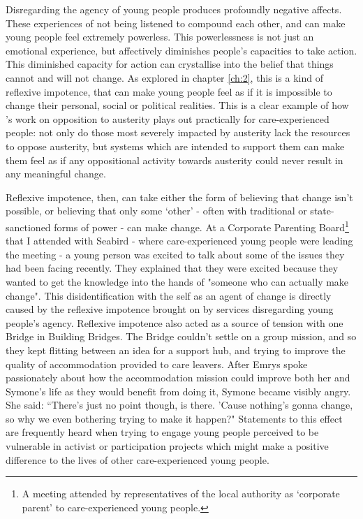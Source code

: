 Disregarding the agency of young people produces profoundly negative affects. These experiences of not being listened to compound each other, and can make young people feel extremely powerless. This powerlessness is not just an emotional experience, but affectively diminishes people’s capacities to take action. This diminished capacity for action can crystallise into the belief that things cannot and will not change. As explored in chapter \ref{ch:2}, this is a kind of reflexive impotence, that can make young people feel as if it is impossible to change their personal, social or political realities. This is a clear example of how \citet{harrison_cant_2020}’s work on opposition to austerity plays out practically for care-experienced people: not only do those most severely impacted by austerity lack the resources to oppose austerity, but systems which are intended to support them can make them feel as if any oppositional activity towards austerity could never result in any meaningful change. 

Reflexive impotence, then, can take either the form of believing that change isn’t possible, or believing that only some ‘other’ - often with traditional or state-sanctioned forms of power - can make change. At a Corporate Parenting Board\footnote{A meeting attended by representatives of the local authority as `corporate parent’ to care-experienced young people.} that I attended with Seabird - where care-experienced young people were leading the meeting - a young person was excited to talk about some of the issues they had been facing recently. They explained that they were excited because they wanted to get the knowledge into the hands of "someone who can actually make change".  This disidentification with the self as an agent of change is directly caused by the reflexive impotence brought on by services disregarding young people’s agency. Reflexive impotence also acted as a source of tension with one Bridge in Building Bridges. The Bridge couldn’t settle on a  group mission, and so they kept flitting between an idea for a support hub, and trying to improve the quality of accommodation provided to care leavers. After Emrys spoke passionately about how the accommodation mission could improve both her and Symone's life as they would benefit from doing it, Symone became visibly angry. She said: “There's just no point though, is there. 'Cause nothing's gonna change, so why we even bothering trying to make it happen?" Statements to this effect are frequently heard when trying to engage young people perceived to be vulnerable in activist or participation projects which might make a positive difference to the lives of other care-experienced young people. 

